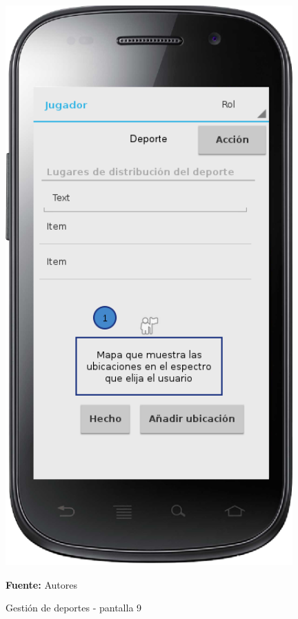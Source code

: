 \begin{figure}[!htb]
  \begin{center}
    \includegraphics[width=11cm]{./imagenes/UI/Deportes/gestion_deportes_9.png}
    \caption{Gestión de deportes - pantalla 9}
    \label{fig:gestion_deportes_9}
    \textbf{Fuente:}  Autores
  \end{center}
\end{figure}

